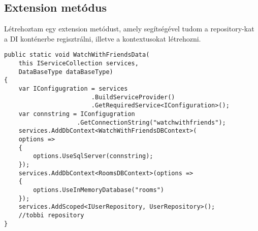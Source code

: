 \subsection*{Extension metódus}
Létrehoztam egy extension metódust, amely segítségével tudom a repository-kat a DI konténerbe regisztrálni, illetve a kontextusokat létrehozni.
\begin{lstlisting}[language=CSharp,style=CSharpBase]
public static void WatchWithFriendsData(
    this IServiceCollection services,
    DataBaseType dataBaseType)
{
    var IConfigugration = services
                        .BuildServiceProvider()
                        .GetRequiredService<IConfiguration>();
    var connstring = IConfigugration
                    .GetConnectionString("watchwithfriends");
    services.AddDbContext<WatchWithFriendsDBContext>(
    options =>
    {
        options.UseSqlServer(connstring);
    });
    services.AddDbContext<RoomsDBContext>(options =>
    {
        options.UseInMemoryDatabase("rooms")
    });
    services.AddScoped<IUserRepository, UserRepository>();
    //tobbi repository
}

\end{lstlisting}
\vspace{1em}